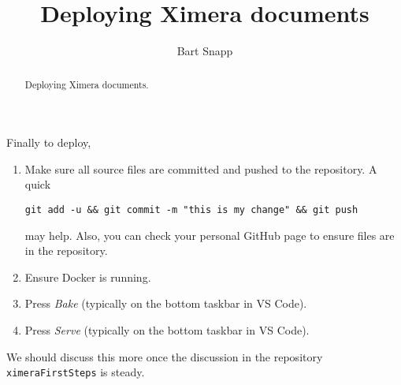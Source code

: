 \documentclass{ximera}
\title{Deploying Ximera documents}
\author{Bart Snapp}
\begin{document}
\begin{abstract}
    Deploying Ximera documents.
\end{abstract}
\maketitle

Finally to deploy,
\begin{enumerate}
    \item Make sure all source files are committed and pushed to the repository. A quick 
\begin{verbatim}
git add -u && git commit -m "this is my change" && git push
\end{verbatim}
may help. Also, you can check your personal GitHub page to ensure files are in the repository.
\item Ensure Docker is running.
\item Press \textit{Bake} (typically on the bottom taskbar in VS Code).
\item Press \textit{Serve} (typically on the bottom taskbar in VS Code).
\end{enumerate}

We should discuss this more once the discussion in the repository \verb!ximeraFirstSteps! is steady.
\end{document}
